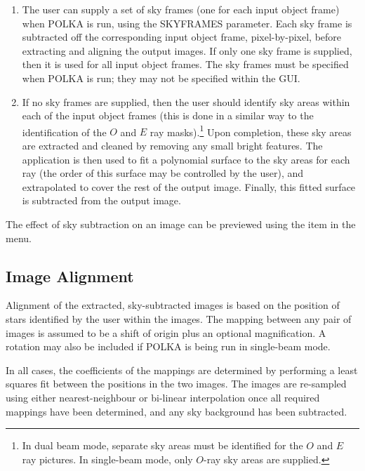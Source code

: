 \documentclass[11pt,nolof]{starlink}
\providecommand{\mylabel}[1] {\xlabel{#1}\label{#1}}
\begin{document}
\begin{enumerate}

\item The user can supply a set of sky frames (one for each input object
frame) when POLKA is run, using the SKYFRAMES parameter. Each sky
frame is subtracted off the corresponding input object frame,
pixel-by-pixel, before extracting and aligning the output images. If only
one sky frame is supplied, then it is used for all input object frames.
The sky frames must be specified when POLKA is run; they may not be
specified within the GUI.

\item If no sky frames are supplied, then the user should identify sky areas
within each of the input object frames (this is done in a similar way to
the identification of the $O$ and $E$ ray masks).\footnote{In dual beam
mode, separate sky areas must be identified for the $O$ and $E$ ray
pictures. In single-beam mode, only $O$-ray sky areas are supplied.}
Upon completion, these sky areas are extracted and cleaned by removing
any small bright features. The  application
 is then used to fit a polynomial surface
to the sky areas for each ray (the order of this surface may be controlled
by the user), and extrapolated to cover the rest of the output image.
Finally, this fitted surface is subtracted from the output image.

\end{enumerate}

The effect of sky subtraction on an image can be previewed using the
 item in the
 menu.

\subsection{\mylabel{POLKA_ALIGNMENT}Image Alignment}
Alignment of the extracted, sky-subtracted images is based on the
position of stars identified by the user within the images. The mapping
between any pair of images is assumed to be a shift of origin plus an
optional magnification. A rotation may also be included if POLKA is being
run in single-beam mode.

In all cases, the coefficients of the mappings are determined by
performing a least squares fit between the positions in the two images.
The images are re-sampled using either nearest-neighbour or bi-linear
interpolation once all required mappings have been determined, and any
sky background has been subtracted.
\end{document}
